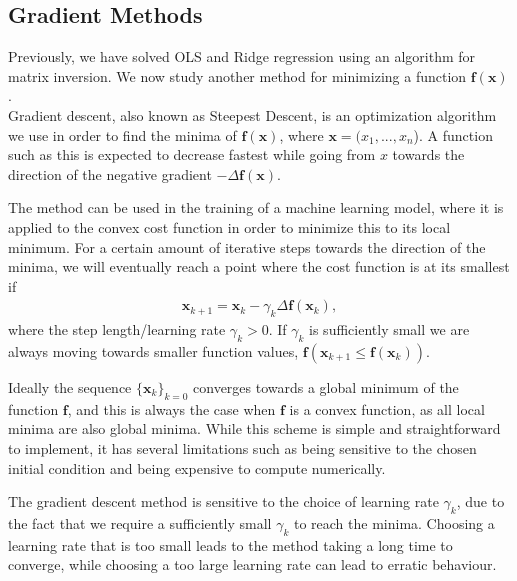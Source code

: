 \documentclass[english,notitlepage,reprint,nofootinbib]{revtex4-2}  %
\begin{document}
\subsection*{Gradient Methods}
Previously, we have solved OLS and Ridge regression using an algorithm for matrix inversion. 
We now study another method for minimizing a function $\boldsymbol{f}(\boldsymbol{x})$. 
\vspace{3mm}
\\ 
Gradient descent, also known as Steepest Descent, is an optimization algorithm we use in order to find the minima of $\boldsymbol{f}(\boldsymbol{x})$, where $\boldsymbol{x} = (x_1, ..., x_n$). A function such as this is expected to decrease fastest while going from $x$ towards the direction of the negative gradient $-\Delta\boldsymbol{f}(\boldsymbol{x})$. 

The method can be used in the training of a machine learning model, where it is applied to the convex cost function in order to minimize this to its local minimum. 
For a certain amount of iterative steps towards the direction of the minima, we will eventually reach a point where the cost function is at its smallest if 
\begin{align}
    \boldsymbol{x}_{k+1} = \boldsymbol{x}_k - \gamma_k \Delta\boldsymbol{f}(\boldsymbol{x}_k), \nonumber 
\end{align}
where the step length/learning rate $\gamma_k > 0$. If $\gamma_k$ is sufficiently small we are always moving towards smaller function values, $\boldsymbol{f}(\boldsymbol{x}_{k+1} \leq \boldsymbol{f}(\boldsymbol{x}_k))$. 

Ideally the sequence $\{\boldsymbol{x}_k\}_{k=0}$ converges towards a global minimum of the function $\boldsymbol{f}$, and this is always the case when $\boldsymbol{f}$ is a convex function, as all local minima are also global minima. While this scheme is simple and straightforward to implement, it has several limitations such as being sensitive to the chosen initial condition and being expensive to compute numerically.

The gradient descent method is sensitive to the choice of learning rate $\gamma_k$, due to the fact that we require a sufficiently small $\gamma_k$ to reach the minima. Choosing a learning rate that is too small leads to the method taking a long time to converge, while choosing a too large learning rate can lead to erratic behaviour. 
\end{document}
